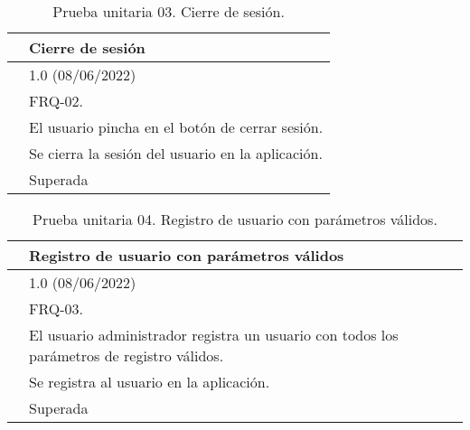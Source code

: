 \begin{table}[H]
\begin{center}
\begin{tabular}{|p{3cm}|p{10cm}|} \hline
\centering {\bf PU-03} & Cierre de sesión  \\ \hline\hline
\centering {\bf Versión} & 1.0 (08/06/2022) \\ \hline
\centering {\bf Dependencias} & FRQ-02. \\ \hline
\centering {\bf Descripción} &  El usuario pincha en el botón de cerrar sesión. \\ \hline
\centering {\bf Criterio de aceptación} & Se cierra la sesión del usuario en la aplicación. \\ \hline
\centering {\bf Estado} & Superada \\ \hline
\end{tabular}
\caption{Prueba unitaria 03. Cierre de sesión.}
\label{enlacePU3}
\end{center}
\end{table}

\begin{table}[H]
\begin{center}
\begin{tabular}{|p{3cm}|p{10cm}|} \hline
\centering {\bf PU-04} & Registro de usuario con parámetros válidos  \\ \hline\hline
\centering {\bf Versión} & 1.0 (08/06/2022) \\ \hline
\centering {\bf Dependencias} & FRQ-03. \\ \hline
\centering {\bf Descripción} &  El usuario administrador registra un usuario con todos los parámetros de registro válidos. \\ \hline
\centering {\bf Criterio de aceptación} & Se registra al usuario en la aplicación. \\ \hline
\centering {\bf Estado} & Superada \\ \hline
\end{tabular}
\caption{Prueba unitaria 04. Registro de usuario con parámetros válidos.}
\label{enlacePU4}
\end{center}
\end{table}

